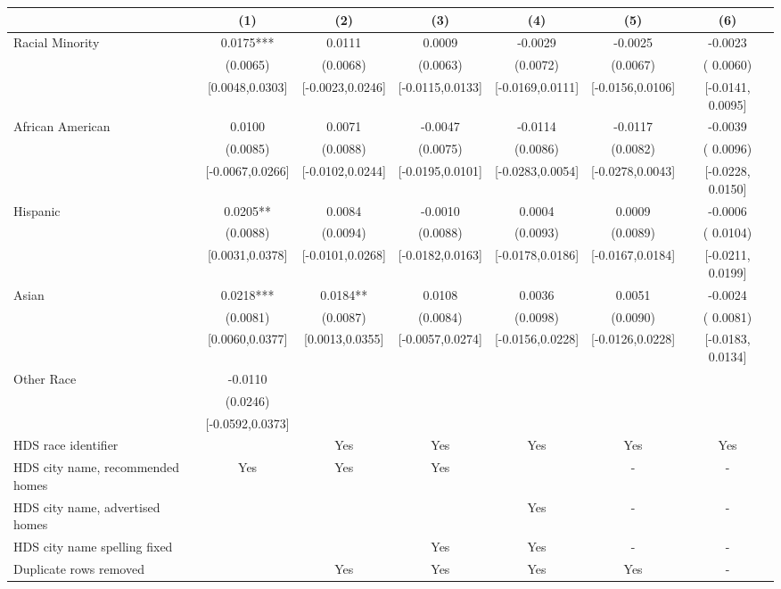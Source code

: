 \begin{table}[htbp]
{\begin{tabular}{l*{6}{c}}
                    \cmidrule(lr){2-2}\cmidrule(lr){3-3}\cmidrule(lr){4-4}\cmidrule(lr){5-5}\cmidrule(lr){6-6}\cmidrule(lr){7-7}
                    &\multicolumn{1}{c}{(1)}   &\multicolumn{1}{c}{(2)}   &\multicolumn{1}{c}{(3)}   &\multicolumn{1}{c}{(4)}   &\multicolumn{1}{c}{(5)}   &\multicolumn{1}{c}{(6)}\\
\midrule
Racial Minority & 0.0175*** & 0.0111 & 0.0009 & -0.0029 & -0.0025 & -0.0023 \\
 & (0.0065) & (0.0068) & (0.0063) & (0.0072) & (0.0067) & ( 0.0060) \\
 & [0.0048,0.0303] & [-0.0023,0.0246] & [-0.0115,0.0133] & [-0.0169,0.0111] & [-0.0156,0.0106] & [-0.0141,  0.0095] \\
\midrule
African American & 0.0100 & 0.0071 & -0.0047 & -0.0114 & -0.0117 & -0.0039 \\
 & (0.0085) & (0.0088) & (0.0075) & (0.0086) & (0.0082) & ( 0.0096) \\
 & [-0.0067,0.0266] & [-0.0102,0.0244] & [-0.0195,0.0101] & [-0.0283,0.0054] & [-0.0278,0.0043] & [-0.0228,  0.0150] \\
Hispanic & 0.0205** & 0.0084 & -0.0010 & 0.0004 & 0.0009 & -0.0006 \\
 & (0.0088) & (0.0094) & (0.0088) & (0.0093) & (0.0089) & ( 0.0104) \\
 & [0.0031,0.0378] & [-0.0101,0.0268] & [-0.0182,0.0163] & [-0.0178,0.0186] & [-0.0167,0.0184] & [-0.0211,  0.0199] \\
Asian & 0.0218*** & 0.0184** & 0.0108 & 0.0036 & 0.0051 & -0.0024 \\
 & (0.0081) & (0.0087) & (0.0084) & (0.0098) & (0.0090) & ( 0.0081) \\
 & [0.0060,0.0377] & [0.0013,0.0355] & [-0.0057,0.0274] & [-0.0156,0.0228] & [-0.0126,0.0228] & [-0.0183,  0.0134] \\
Other Race & -0.0110 &  &  &  &  &  \\
 & (0.0246) &  &  &  &  &  \\
 & [-0.0592,0.0373] &  &  &  &  &  \\
\midrule
HDS race identifier & & Yes & Yes & Yes & Yes & Yes \\
HDS city name, recommended homes & Yes & Yes & Yes & & - & -\\
HDS city name, advertised homes &  &  &  & Yes & - & -\\
HDS city name spelling fixed & & & Yes & Yes & - & -\\
Duplicate rows removed &  & Yes & Yes & Yes & Yes & - \\

\end{tabular}}
\end{table}
